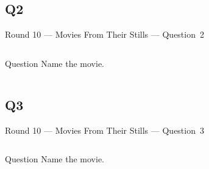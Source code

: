 \documentclass[11pt]{beamer}
\begin{document}
\subsection*{Q2}
\begin{frame}[t]{Round 10 --- Movies From Their Stills --- \mbox{Question 2}}
    \vspace{-0.5em}
    \begin{columns}[T,totalwidth=\linewidth]
        \begin{column}{0.32\linewidth}
            \begin{block}{Question}
                Name the movie.
            \end{block}
        \end{column}
        \begin{column}{0.65\linewidth}
            \begin{center}
                \texttt{[image: \{Images/grapesofwrath]}.jpg}
            \end{center}
        \end{column}
    \end{columns}
\end{frame}
\subsection*{Q3}
\begin{frame}[t]{Round 10 --- Movies From Their Stills --- \mbox{Question 3}}
    \vspace{-0.5em}
    \begin{columns}[T,totalwidth=\linewidth]
        \begin{column}{0.32\linewidth}
            \begin{block}{Question}
                Name the movie.
            \end{block}
        \end{column}
        \begin{column}{0.65\linewidth}
            \begin{center}
                \texttt{[image: \{Images/seven-yearitch]}.jpg}
            \end{center}
        \end{column}
    \end{columns}
\end{frame}
\end{document}
